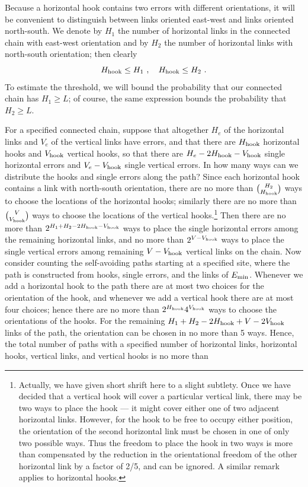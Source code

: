 Because a horizontal hook contains two errors with different orientations, it will be convenient to distinguish between links oriented east-west and links oriented north-south. We denote by $H_1$ the number of horizontal links in the connected chain with east-west orientation and by $H_2$ the number of horizontal links with north-south orientation; then clearly 
\begin{equation}
H_{\rm hook}\le H_1~,\quad H_{\rm hook} \le H_2~.
\end{equation}
To estimate the threshold, we will bound the probability that our connected chain has $H_1\ge L$; of course, the same expression bounds the probability that $H_2\ge L$.

For a specified connected chain, suppose that altogether $H_e$ of the horizontal links and $V_e$ of the vertical links have errors, and that there are $H_{\rm hook}$ horizontal hooks and $V_{\rm hook}$ vertical hooks, so that there are $H_e-2H_{\rm hook}-V_{\rm hook}$ single horizontal errors and $V_e-V_{\rm hook}$ single vertical errors. In how many ways can we distribute the hooks and single errors along the path? Since each horizontal hook contains a link with north-south orientation, there are no more than ${H_2}\choose{H_{\rm hook}}$ ways to choose the locations of the horizontal hooks; similarly there are no more than ${V\choose V_{\rm hook}}$ ways to choose the locations of the vertical hooks.\footnote{Actually, we have given short shrift here to a slight subtlety. Once we have decided that a vertical hook will cover a particular vertical link, there may be two ways to place the hook --- it might cover either one of two adjacent horizontal links. However, for the hook to be free to occupy either position, the orientation of the second horizontal link must be chosen in one of only two possible ways.  Thus the freedom to place the hook in two ways is more than compensated by the reduction in the orientational freedom of the other horizontal link by a factor of 2/5, and can be ignored. A similar remark applies to horizontal hooks.} Then there are no more than $2^{H_1+H_2-2H_{\rm hook}-V_{\rm hook}}$ ways to place the single horizontal errors among the remaining horizontal links, and no more than $2^{V-V_{\rm hook}}$ ways to place the single vertical errors among remaining $V-V_{\rm hook}$ vertical links on the chain. 
Now consider counting the self-avoiding paths starting at a specified site, where the path is constructed from hooks, single errors, and the links of $E_{\rm min}$. Whenever we add a horizontal hook to the path there are at most two choices for the orientation of the hook, and whenever we add a vertical hook there are at most four choices; hence there are no more than $2^{H_{\rm hook}}4^{V_{\rm hook}}$ ways to choose the orientations of the hooks. For the remaining $H_1 +H_2 - 2H_{\rm hook} +V- 2V_{\rm hook}$ links of the path, the orientation can be chosen in no more than 5 ways. Hence, the total number of paths with a specified number of horizontal links, horizontal hooks, vertical links, and vertical hooks is no more than
